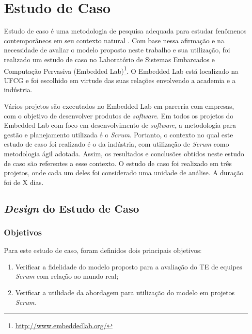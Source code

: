\chapter{Estudo de Caso}
\label{estudodecaso}

Estudo de caso é uma metodologia de pesquisa adequada para estudar fenômenos contemporâneos em seu contexto natural \cite{runeson}. Com base nessa afirmação e na necessidade de avaliar o modelo proposto neste trabalho e sua utilização, foi realizado um estudo de caso no Laboratório de Sistemas Embarcados e Computação Pervasiva (Embedded Lab)\footnote{\url{http://www.embeddedlab.org/}}. O Embedded Lab está localizado na UFCG e foi escolhido em virtude das suas relações envolvendo a academia e a indústria.

Vários projetos são executados no Embedded Lab em parceria com empresas, com o objetivo de desenvolver produtos de \textit{software}. Em todos os projetos do Embedded Lab com foco em desenvolvimento de \textit{software}, a metodologia para gestão e planejamento utilizada é o \textit{Scrum}. Portanto, o contexto no qual este estudo de caso foi realizado é o da indústria, com utilização de \textit{Scrum} como metodologia ágil adotada. Assim, os resultados e conclusões obtidos neste estudo de caso são referentes a esse contexto. O estudo de caso foi realizado em três projetos, onde cada um deles foi considerado uma unidade de análise. {\color{red} A duração foi de X dias.}

\section{\textit{Design} do Estudo de Caso}
\label{estudodecaso:design}

\subsection{Objetivos}
\label{estudodecaso:design:objetivos}

Para este estudo de caso, foram definidos dois principais objetivos:

\begin{enumerate}
  \item Verificar a fidelidade do modelo proposto para a avaliação do TE de equipes \textit{Scrum} com relação ao mundo real;
  \item Verificar a utilidade da abordagem para utilização do modelo em projetos \textit{Scrum}.
\end{enumerate}

